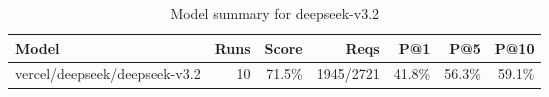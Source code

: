 \begin{table}[htbp]
\centering
\begin{tabular}{lrrrrrr}
\toprule
Model & Runs & Score & Reqs & P@1 & P@5 & P@10 \\
\midrule
vercel/deepseek/deepseek-v3.2 & 10 & 71.5\% & 1945/2721 & 41.8\% & 56.3\% & 59.1\% \\
\bottomrule
\end{tabular}
\caption{Model summary for deepseek-v3.2}
\end{table}
